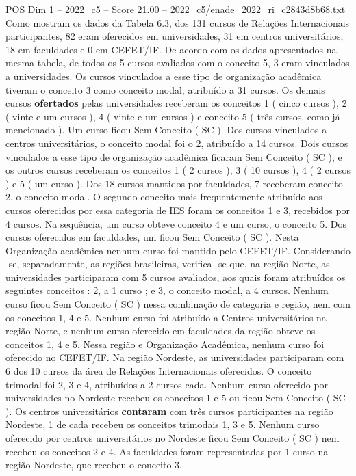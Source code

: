 \begin{textsample}{POS Dim 1 – 2022\_c5 – Score 21.00 – 2022\_c5/enade\_2022\_ri\_c2843d8b68.txt}
Como mostram os dados da Tabela 6.3, dos 131 cursos de Relações Internacionais participantes, 82 eram oferecidos em universidades, 31 em centros universitários, 18 em faculdades e 0 em CEFET/IF.
De acordo com os dados apresentados na mesma tabela, de todos os 5 cursos avaliados com o conceito 5, 3 eram vinculados a universidades.
Os cursos vinculados a esse tipo de organização acadêmica tiveram o conceito 3 como conceito modal, atribuído a 31 cursos.
Os demais cursos \textbf{ofertados} pelas universidades receberam os conceitos 1 ( cinco cursos ), 2 ( vinte e um cursos ), 4 ( vinte e um cursos ) e conceito 5 ( três cursos, como já mencionado ).
Um curso ficou Sem Conceito ( SC ).
Dos cursos vinculados a centros universitários, o conceito modal foi o 2, atribuído a 14 cursos.
Dois cursos vinculados a esse tipo de organização acadêmica ficaram Sem Conceito ( SC ), e os outros cursos receberam os conceitos 1 ( 2 cursos ), 3 ( 10 cursos ), 4 ( 2 cursos ) e 5 ( um curso ).
Dos 18 cursos mantidos por faculdades, 7 receberam conceito 2, o conceito modal.
O segundo conceito mais frequentemente atribuído aos cursos oferecidos por essa categoria de IES foram os conceitos 1 e 3, recebidos por 4 cursos.
Na sequência, um curso obteve conceito 4 e um curso, o conceito 5.
Dos cursos oferecidos em faculdades, um ficou Sem Conceito ( SC ).
Nesta Organização acadêmica nenhum curso foi mantido pelo CEFET/IF.
Considerando -se, separadamente, as regiões brasileiras, verifica -se que, na região Norte, as universidades participaram com 5 cursos avaliados, aos quais foram atribuídos os seguintes conceitos : 2, a 1 curso ; e 3, o conceito modal, a 4 cursos.
Nenhum curso ficou Sem Conceito ( SC ) nessa combinação de categoria e região, nem com os conceitos 1, 4 e 5.
Nenhum curso foi atribuído a Centros universitários na região Norte, e nenhum curso oferecido em faculdades da região obteve os conceitos 1, 4 e 5.
Nessa região e Organização Acadêmica, nenhum curso foi oferecido no CEFET/IF.
Na região Nordeste, as universidades participaram com 6 dos 10 cursos da área de Relações Internacionais oferecidos.
O conceito trimodal foi 2, 3 e 4, atribuídos a 2 cursos cada.
Nenhum curso oferecido por universidades no Nordeste recebeu os conceitos 1 e 5 ou ficou Sem Conceito ( SC ).
Os centros universitários \textbf{contaram} com três cursos participantes na região Nordeste, 1 de cada recebeu os conceitos trimodais 1, 3 e 5.
Nenhum curso oferecido por centros universitários no Nordeste ficou Sem Conceito ( SC ) nem recebeu os conceitos 2 e 4.
As faculdades foram representadas por 1 curso na região Nordeste, que recebeu o conceito 3.

\end{textsample}
